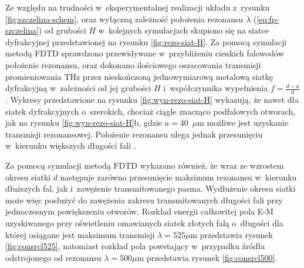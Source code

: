 Ze względu na trudności w~eksperymentalnej realizacji układu z~rysunku \ref{fig:szczelina-schem}, oraz wyłączną zależność położenia rezonansu $\lambda$ (\ref{eq:fp-szczelina}) od grubości $H$ w~kolejnych symulacjach skupiono się na siatce dyfrakcyjnej przedstawionej na rysunku \ref{fig:rezo-siat-H}.  Za pomocą symulacji metodą FDTD sprawdzono przewidywane w~przybliżeniu cienkich falowodów położenie rezonansu, oraz dokonano ilościowego oszacowania transmisji promieniowania THz przez nieskończoną jednowymiarową metalową siatkę dyfrakcyjną w~zależności od jej grubości $H$ i~współczynnika wypełnienia $f=\frac{d-a}{d}$. Wykresy przedstawione na rysunku \ref{fig:wyn-rezo-siat-H} wykazują, że nawet dla siatek dyfrakcyjnych o~szerokich, chociaż ciągle znacząco podfalowych otworach, jak na rysunku \ref{fig:wyn-rezo-siat-H}b, gdzie $a=40$~$\mu$m możliwe jest uzyskanie transmisji rezonansowej. Położenie rezonansu ulega jednak przesunięciu w~kierunku większych długości fali \cite{Szczytko2012271}.

Za pomocą symulacji metodą FDTD wykazano również, że wraz ze wzrostem okresu siatki $d$ następuje zarówno przesunięcie maksimum rezonansu w~kierunku dłuższych fal, jak i~zawężenie transmitowanego pasma. Wydłużenie okresu siatki może więc posłużyć do zawężenia zakresu transmitowanych długości fali przy jednoczesnym powiększeniu otworów. Rozkład energii całkowitej pola E-M uzyskiwanego przy oświetleniu omawianych siatek złotych falą o~długości dla której osiągane jest maksimum transmisji $\lambda=525 \mu$m przedstawia rysunek \ref{fig:consrcl525}, natomiast rozkład pola powstający w~przypadku źródła odstrojonego od rezonansu $\lambda=500\mu$m przedstawia rysunek \ref{fig:consrcl500}.

